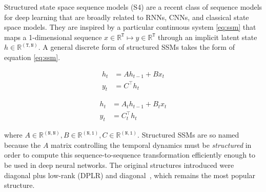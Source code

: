 \documentclass{article}
\newcommand{\citep}{\parencite}
\newcommand{\R}{\mathbb{R}}
\begin{document}
Structured state space sequence models (S4) are a recent class of sequence models for deep learning that are broadly related to RNNs, CNNs,
and classical state space models.
They are inspired by a particular continuous system \eqref{eq:ssm}
that maps a 1-dimensional sequence $x \in \R^\mathtt{T} \mapsto y \in \R^\mathtt{T}$ through an implicit latent state \( h \in \R^{\mathtt{(T, N)}} \). 
\iftoggle{arxiv}{

}{}
A general discrete form of structured SSMs takes the form of equation \eqref{eq:ssm}.
\begin{center}
  \vspace*{-1em}
\begin{minipage}[t]{.45\linewidth}
\begin{subequations}
  \label{eq:ssm}
  \begin{align}
  \label{eq:ssm:1}
    h_{t} &= A h_{t-1} + B x_t \\
  \label{eq:ssm:2}
    y_t &= C^{\top} h_t
  \end{align}
\end{subequations}
\end{minipage}
\qquad
\begin{minipage}[t]{.45\linewidth}
\begin{subequations}
  \label{eq:s6}
  \begin{align}
  \label{eq:s6:1}
    h_{t} &= A_t h_{t-1} + B_t x_t \\
  \label{eq:s6:2}
    y_t &= C_t^{\top} h_t
  \end{align}
\end{subequations}
\end{minipage}
\end{center}

where $A \in \R^{\mathtt{(N,N)}}, B \in \R^{\mathtt{(N,1)}}, C \in \R^{\mathtt{(N,1)}}$.
Structured SSMs are so named because the $A$ matrix controlling the temporal dynamics must be \emph{structured} in order to compute this sequence-to-sequence transformation efficiently enough to be used in deep neural networks.
The original structures introduced were diagonal plus low-rank (DPLR) \citep{gu2022efficiently} and diagonal~\citep{gupta2022diagonal,gu2022parameterization,smith2023s5}, which remains the most popular structure.
\end{document}
